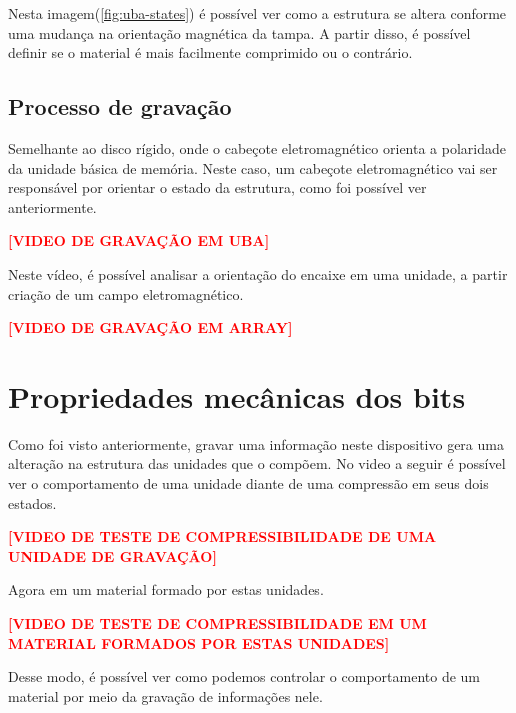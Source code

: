 Nesta imagem(\ref{fig:uba-states}) é possível ver como a estrutura se altera conforme uma mudança na orientação magnética da tampa. A partir disso, é possível definir se o material é mais facilmente comprimido ou o contrário.



\subsection{Processo de gravação}

Semelhante ao disco rígido, onde o cabeçote eletromagnético orienta a polaridade da unidade básica de memória. Neste caso, um cabeçote eletromagnético vai ser responsável por orientar o estado da estrutura, como foi possível ver anteriormente.

\begin{center}
\textcolor{red}{\textbf{[VIDEO DE GRAVAÇÃO EM UBA]}}
\end{center}

Neste vídeo, é possível analisar a orientação do encaixe em uma unidade, a partir criação de um campo eletromagnético.

\begin{center}
\textcolor{red}{\textbf{[VIDEO DE GRAVAÇÃO EM ARRAY]}}
\end{center}


\section{Propriedades mecânicas dos bits}

Como foi visto anteriormente, gravar uma informação neste dispositivo gera uma alteração na estrutura das unidades que o compõem. No video a seguir é possível ver o comportamento de uma unidade diante de uma compressão em seus dois estados. 

\begin{center}
\textcolor{red}{\textbf{[VIDEO DE TESTE DE COMPRESSIBILIDADE DE UMA UNIDADE DE GRAVAÇÃO]}}
\end{center}
    
Agora em um material formado por estas unidades. 

\begin{center}
\textcolor{red}{\textbf{[VIDEO DE TESTE DE COMPRESSIBILIDADE EM UM MATERIAL FORMADOS POR ESTAS UNIDADES]}}
\end{center}

Desse modo, é possível ver como podemos controlar o comportamento de um material por meio da gravação de informações nele. 
